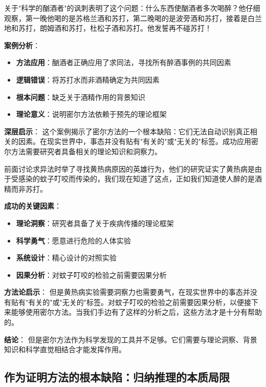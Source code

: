 \begin{examplebox}[title="科学的酗酒者"：相关性识别失败的经典案例]
关于"科学的酗酒者"的讽刺表明了这个问题：什么东西使酗酒者多次喝醉？他仔细观察，第一晚他喝的是苏格兰酒和苏打，第二晚喝的是波旁酒和苏打，接着是白兰地和苏打，朗姆酒和苏打，杜松子酒和苏打。他发誓再不碰苏打！

\textbf{案例分析}：
\begin{itemize}
\item \textbf{方法应用}：酗酒者正确应用了求同法，寻找所有醉酒事例的共同因素
\item \textbf{逻辑错误}：将苏打水而非酒精确定为共同因素
\item \textbf{根本问题}：缺乏关于酒精作用的背景知识
\item \textbf{理论意义}：说明密尔方法依赖于预先的理论框架
\end{itemize}

\textbf{深层启示}：
这个案例揭示了密尔方法的一个根本缺陷：它们无法自动识别真正相关的因素。在现实世界中，事态并没有贴有"有关的"或"无关的"标签。成功应用密尔方法需要研究者具备相关的理论知识和洞察力。
\end{examplebox}

\begin{examplebox}[title=黄热病研究：理论洞察与方法应用的结合]
前面讨论求异法时举了寻找黄热病原因的英雄行为，他们的研究证实了黄热病是由于受感染的蚊子叮咬而传染的，我们现在知道了这点，正如我们知道使人醉的是酒精而非苏打。

\textbf{成功的关键因素}：
\begin{itemize}
\item \textbf{理论洞察}：研究者具备了关于疾病传播的理论框架
\item \textbf{科学勇气}：愿意进行危险的人体实验
\item \textbf{系统设计}：精心设计的对照实验
\item \textbf{因果分析}：对蚊子叮咬的检验之前需要因果分析
\end{itemize}

\textbf{方法论启示}：
但是黄热病实验需要洞察力也需要勇气，在现实世界中的事态并没有贴有"有关的"或"无关的"标签。对蚊子叮咬的检验之前需要因果分析，以便接下来能够使用密尔方法。当我们手边有了这样的分析之后，这些方法才是十分有帮助的。

\textbf{结论}：
但是密尔方法作为科学发现的工具并不足够。它们需要与理论洞察、背景知识和科学直觉相结合才能发挥作用。
\end{examplebox}

\subsection{作为证明方法的根本缺陷：归纳推理的本质局限}

